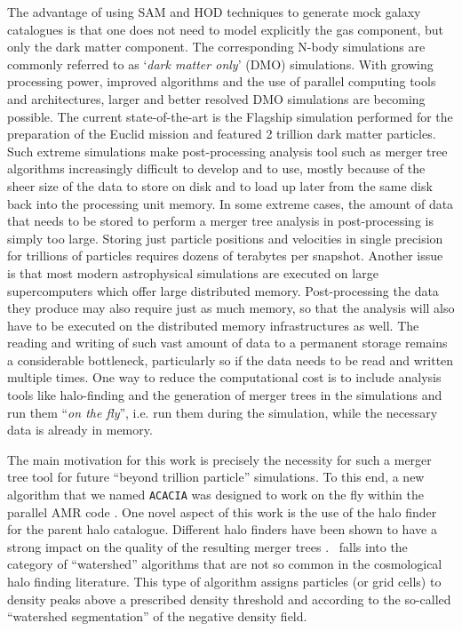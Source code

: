 The advantage of using SAM and HOD techniques to generate mock galaxy
catalogues is that one does not need to model explicitly the gas
component, but only the dark matter component.  The corresponding
N-body simulations are commonly referred to as `\emph{dark matter
only}' (DMO) simulations.  With growing processing power, improved
algorithms and the use of parallel computing tools and architectures,
larger and better resolved DMO simulations are becoming possible.  The
current state-of-the-art is the Flagship simulation performed for the
preparation of the Euclid mission \citep{PKDGRAV} and featured 2
trillion dark matter particles.  Such extreme simulations make
post-processing analysis tool such as merger tree algorithms
increasingly difficult to develop and to use, mostly because of the
sheer size of the data to store on disk and to load up later from the
same disk back into the processing unit memory.  In some extreme
cases, the amount of data that needs to be stored to perform a merger
tree analysis in post-processing is simply too large.  Storing just
particle positions and velocities in single precision for trillions of
particles requires dozens of terabytes per snapshot.  Another issue is
that most modern astrophysical simulations are executed on large
supercomputers which offer large distributed memory.  Post-processing
the data they produce may also require just as much memory, so that
the analysis will also have to be executed on the distributed memory
infrastructures as well.  The reading and writing of such vast amount
of data to a permanent storage remains a considerable bottleneck,
particularly so if the data needs to be read and written multiple
times.  One way to reduce the computational cost is to include
analysis tools like halo-finding and the generation of merger trees in
the simulations and run them ``\textit{on the fly}'', i.e. run them
during the simulation, while the necessary data is already in memory.

The main motivation for this work is precisely the necessity for such
a merger tree tool for future ``beyond trillion particle''
simulations.  To this end, a new algorithm that we named
\texttt{ACACIA} was designed to work on the fly within the parallel
AMR code \ramses.  One novel aspect of this work is the use of the
halo finder \phew\ \citep{PHEW} for the parent halo catalogue.
Different halo finders have been shown to have a strong impact on the
quality of the resulting merger trees \citep{SUSSING_HALOFINDER}.
\phew\ falls into the category of ``watershed'' algorithms that are
not so common in the cosmological halo finding literature.  This type
of algorithm assigns particles (or grid cells) to density peaks above
a prescribed density threshold and according to the so-called
``watershed segmentation'' of the negative density field.


